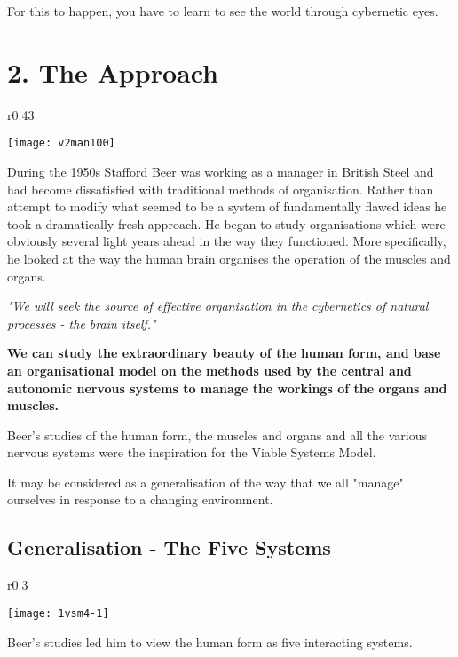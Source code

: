For this to happen, you have to learn to see the world through cybernetic eyes.

\section*{2. The Approach}
\begin{wrapfigure}[12]{r}{0.43\textwidth}
    \begin{center}
        \texttt{[image: v2man100]}
    \end{center}
\end{wrapfigure}
During the 1950s Stafford Beer was working as a manager in British Steel and had become dissatisfied with traditional methods of organisation. Rather than attempt to modify what seemed to be a system of fundamentally flawed ideas he took a dramatically fresh approach. He began to study organisations which were obviously several light years ahead in the way they functioned. More specifically, he looked at the way the human brain organises the operation of the muscles and organs.

\textit{"We will seek the source of effective organisation in the cybernetics of natural processes - the brain itself."}

\textbf{We can study the extraordinary beauty of the human form, and base an organisational model on the methods used by the central and autonomic nervous systems to manage the workings of the organs and muscles.}

Beer's studies of the human form, the muscles and organs and all the various nervous systems were the inspiration for the Viable Systems Model.

It may be considered as a generalisation of the way that we all "manage" ourselves in response to a changing environment.


\subsection*{Generalisation - The Five Systems}

\begin{wrapfigure}{r}{0.3\textwidth}
    \begin{center}
        \texttt{[image: 1vsm4-1]}
    \end{center}
\end{wrapfigure}
Beer's studies led him to view the human form as five interacting systems.

